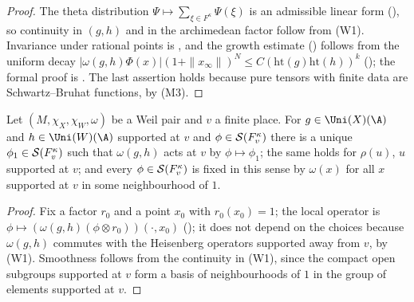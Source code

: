 \begin{proof}
The theta distribution $\Psi\mapsto\sum_{\xi\in F^\kappa}\Psi(\xi)$ is an admissible linear form
(), so continuity in $(g,h)$ and in the
archimedean factor follow from (W1). Invariance under rational points is
, and the growth estimate
() follows from the uniform decay
$|\omega(g,h)\Phi(x)|(1+\|x_\infty\|)^N\le C(\mathrm{ht}(g)\mathrm{ht}(h))^k$
(); the formal proof is
. The last assertion holds because pure tensors with
finite data are Schwartz--Bruhat functions, by (M3).
\end{proof}

\begin{proposition}\label{pf:tlift:acts}
Let $(M,\chi_X,\chi_W,\omega)$ be a Weil pair and $v$ a finite place. For $g\in\Uni(X)(\A)$ and $h\in\Uni(W)(\A)$
supported at $v$ and $\phi\in\mathcal{S}(F_v^\kappa)$ there is a unique $\phi_1\in\mathcal{S}(F_v^\kappa)$ such that
$\omega(g,h)$ acts at $v$ by $\phi\mapsto\phi_1$; the same holds for $\rho(u)$, $u$ supported at $v$; and
every $\phi\in\mathcal{S}(F_v^\kappa)$ is fixed in this sense by $\omega(x)$ for all $x$ supported at $v$ in some
neighbourhood of $1$.
\end{proposition}

\begin{proof}
Fix a factor $r_0$ and a point $x_0$ with $r_0(x_0)=1$; the local operator is
$\phi\mapsto(\omega(g,h)(\phi\otimes r_0))(\cdot,x_0)$ (); it
does not depend on the choices because $\omega(g,h)$ commutes with the Heisenberg operators supported
away from $v$, by (W1). Smoothness follows from the continuity in (W1), since the compact open subgroups
supported at $v$ form a basis of neighbourhoods of $1$ in the group of elements supported at $v$.
\end{proof}

